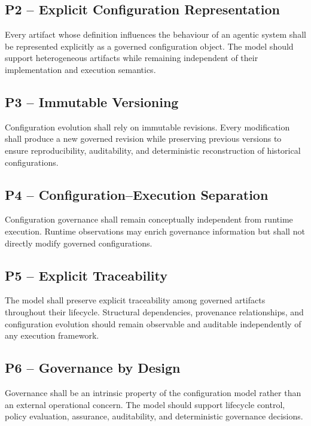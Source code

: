 \documentclass[10pt]{article}
\begin{document}
\subsection{P2 -- Explicit Configuration Representation}

Every artifact whose definition influences the behaviour of an agentic system shall be represented explicitly as a governed configuration object. The model should support heterogeneous artifacts while remaining independent of their implementation and execution semantics.

\subsection{P3 -- Immutable Versioning}

Configuration evolution shall rely on immutable revisions. Every modification shall produce a new governed revision while preserving previous versions to ensure reproducibility, auditability, and deterministic reconstruction of historical configurations.

\subsection{P4 -- Configuration--Execution Separation}

Configuration governance shall remain conceptually independent from runtime execution. Runtime observations may enrich governance information but shall not directly modify governed configurations.

\subsection{P5 -- Explicit Traceability}

The model shall preserve explicit traceability among governed artifacts throughout their lifecycle. Structural dependencies, provenance relationships, and configuration evolution should remain observable and auditable independently of any execution framework.

\subsection{P6 -- Governance by Design}

Governance shall be an intrinsic property of the configuration model rather than an external operational concern. The model should support lifecycle control, policy evaluation, assurance, auditability, and deterministic governance decisions.
\end{document}
